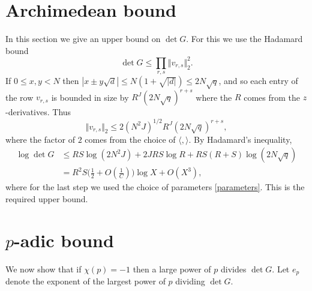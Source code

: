 \documentclass[11pt,reqno]{amsart}
\numberwithin{equation}{section}
\renewcommand{\le}{\leqslant}
\begin{document}
\section{Archimedean bound}

In this section we give an upper bound on $\det G$. For this we use the Hadamard bound
\begin{equation}\label{hadamard} \det G \le \prod_{r,s} \Vert v_{r,s}\Vert_2^2.\end{equation}
If $0 \le x, y < N$ then $|x \pm y \sqrt{d}| \le N(1 +\sqrt{|d|}) \le 2N\sqrt{q}$, and so each entry of the row $v_{r,s}$ is bounded in size by $R^J(2N \sqrt{q})^{r + s}$ where the $R$ comes from the $z$-derivatives. Thus
\[ \Vert v_{r,s} \Vert_2  \le 2 (N^2 J)^{1/2} R^{J}(2N \sqrt{q})^{r + s}, \] where the factor of $2$ comes from the choice of $\langle , \rangle$.
By Hadamard's inequality,
\begin{align}\nonumber \log \det G & \le RS\log (2N^2 J)  + 2JRS \log R + RS(R+S)\log (2N\sqrt{q}) \\ & = R^2 S \big(\frac{1}{2} + O(\frac{1}{C})\big) \log X+ O(X^3),\label{log-g-arch}\end{align}
where for the last step we used the choice of parameters \eqref{parameters}. This is the required upper bound.


\section{$p$-adic bound}

We now show that if $\chi(p) = -1$ then a large power of $p$ divides $\det G$. Let $e_p$ denote the exponent of the largest power of $p$ dividing $\det G$.
\end{document}
